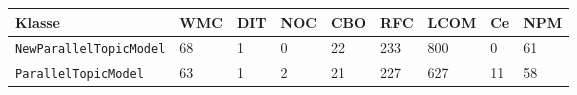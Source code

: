 \documentclass{scrreprt}
\newcommand{\lstx}[1]{\lstinline$#1$}
\begin{document}
\begin{tabular}{lllllllll}
\toprule
Klasse & WMC & DIT & NOC & CBO & RFC & LCOM & Ce & NPM \\
\midrule
\lstx{NewParallelTopicModel} & 68 & 1 & 0 & 22 & 233 & 800 & 0 & 61 \\
\lstx{ParallelTopicModel} & 63 & 1 & 2 & 21 & 227 & 627 & 11 & 58 \\
\bottomrule
\end{tabular}
\end{document}
